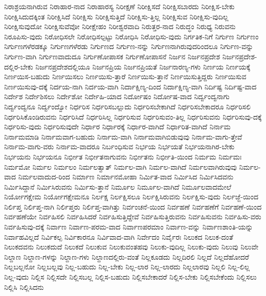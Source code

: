 {ನಿರಾಶ್ರಯನಾಗಿರುವ
ನಿರಾಹಾರ-ನಾದ
ನಿರಾಹಾರಸ್ಯ
ನಿರೀಕ್ಷಣೆ
ನಿರೀಕ್ಷಿಸದೆ
ನಿರೀಕ್ಷಿಸಬಾರದು
ನಿರೀಕ್ಷಿಸ-ಬೇಕು
ನಿರೀಕ್ಷಿಸಿದುದಕ್ಕಿಂತ
ನಿರೀಕ್ಷಿಸಿದೆ
ನಿರೀಕ್ಷಿಸು
ನಿರೀಕ್ಷಿಸುತ್ತಿದೆ
ನಿರೀಕ್ಷಿಸು-ತ್ತಿಲ್ಲ
ನಿರೀಕ್ಷಿಸುವ
ನಿರೀಕ್ಷಿಸು-ವುದಿಲ್ಲ
ನಿರೀಕ್ಷಿಸುವುದೋ
ನಿರೀಕ್ಷಿಸುವೆವೋ
ನಿರೀಕ್ಷೇಹಂ
ನಿರೀಶ್ವರವಾದಿ
ನಿರುತ್ತರ-ನಾದ
ನಿರುದ್ಧಂ
ನಿರುಧ್ಯ
ನಿರುವನು
ನಿರೂಪಿಸು-ವುದು
ನಿರೋಧಿಸಲೇ
ನಿರೋಧಿಸಲ್ಪಟ್ಟು
ನಿರೋಧಿಸಿ
ನಿರೋಧಿಸು-ವುದು
ನಿರ್ಗತಿಕ-ನಿಗೆ
ನಿರ್ಗುಣ
ನಿರ್ಗುಣಂ
ನಿರ್ಗುಣಗಳೆರಡಕ್ಕೂ
ನಿರ್ಗುಣಗಳೆರಡು
ನಿರ್ಗುಣದ
ನಿರ್ಗುಣ-ನನ್ನು
ನಿರ್ಗುಣನಾಗಿರುವುದರಿಂದಲೂ
ನಿರ್ಗುಣ-ವನ್ನು
ನಿರ್ಗುಣ-ವಾಗಿ
ನಿರ್ಗುಣವಾದುದೂ
ನಿರ್ಗುಣೋಪಾಸಕ
ನಿರ್ಗುಣೋಪಾಸನೆ
ನಿರ್ಜನ
ನಿರ್ಜನಪ್ರದೇಶ
ನಿರ್ಜನಪ್ರದೇಶ-ದಲ್ಲಿರ-ಬೇಕು
ನಿರ್ಜನಪ್ರದೇಶದಲ್ಲಿಯೂ
ನಿರ್ಜನಪ್ರಿಯ
ನಿರ್ಜನಪ್ರಿಯತೆ
ನಿರ್ಜನಾರಣ್ಯ-ಗಳು
ನಿರ್ಣಯ
ನಿರ್ಣಯಕ್ಕೆ
ನಿರ್ಣಯಿಸ-ಬಹುದು
ನಿರ್ಣಯಿಸಲು
ನಿರ್ಣಯಿಸು-ತ್ತಾರೆ
ನಿರ್ಣಯಿಸು-ತ್ತಾನೆ
ನಿರ್ಣಯಿಸುತ್ತಿದ್ದರು
ನಿರ್ಣಯಿಸುವ
ನಿರ್ಣಯಿಸುವು-ದಕ್ಕೆ
ನಿರ್ದಯ-ನಾಗಿ
ನಿರ್ದಯ-ವಾಗಿ
ನಿರ್ದಾಕ್ಷಿಣ್ಯ-ದಿಂದ
ನಿರ್ದಾಕ್ಷಿಣ್ಯ-ವಾಗಿ
ನಿರ್ದಿಷ್ಟ
ನಿರ್ದಿಷ್ಟ-ವಾದ
ನಿರ್ದೇಶ
ನಿರ್ದೇಶಿಸಲು
ನಿರ್ದೇಶೋ
ನಿರ್ದೇಹಿ-ಯಾದ
ನಿರ್ದೋಷಂ
ನಿರ್ದೋಷ-ವಾದ
ನಿರ್ದ್ವಂದ್ವನಾಗು
ನಿರ್ದ್ವಂದ್ವನೂ
ನಿರ್ದ್ವಂದ್ವೋ
ನಿರ್ಧರಿಸ
ನಿರ್ಧರಿಸಬಲ್ಲುದು
ನಿರ್ಧರಿಸಬೇಕಾಗಿದೆ
ನಿರ್ಧರಿಸಬೇಕಾದರೂ
ನಿರ್ಧರಿಸಲಿ
ನಿರ್ಧರಿಸಿಕೊಂಡಿರುವನು
ನಿರ್ಧರಿಸಿದೆ
ನಿರ್ಧರಿಸಿಲ್ಲ
ನಿರ್ಧರಿಸುವ
ನಿರ್ಧರಿಸುವಂ-ತಿಲ್ಲ
ನಿರ್ಧರಿಸುವನು
ನಿರ್ಧರಿಸುವು-ದಕ್ಕೆ
ನಿರ್ಧರಿಸು-ವುದು
ನಿರ್ಧರಿಸುವುದೇ
ನಿರ್ಧಾರ
ನಿರ್ಧಾರಕ್ಕೆ
ನಿರ್ಧಾರ-ವಾಗಿದೆ
ನಿರ್ಧಾರಿತ-ವಾಗಿದೆ
ನಿರ್ನಾಮ
ನಿರ್ನಾಮಮಾಡಿ
ನಿರ್ನಾಮವಾಗ-ಬಹುದು
ನಿರ್ನಾಮ-ವಾಗಿ
ನಿರ್ನಾಮವಾಗಿಬಿಡುವುವು
ನಿರ್ನಾಮ-ವಾಗು-ತ್ತೇವೆ
ನಿರ್ನಾಮ-ವಾಗು-ವರು
ನಿರ್ನಾಮ-ವಾದರೂ
ನಿರ್ಬಂಧಿಸುವ
ನಿರ್ಭಯ
ನಿರ್ಭಯತೆ
ನಿರ್ಭಯನಾಗಿರ-ಬೇಕು
ನಿರ್ಭಯನು
ನಿರ್ಭಯನೂ
ನಿರ್ಭೀತ
ನಿರ್ಭೀತನಾಗುವನು
ನಿರ್ಭೀತನು
ನಿರ್ಭೀತಿ-ಯಿಂದ
ನಿರ್ಮಮ
ನಿರ್ಮಮಃ
ನಿರ್ಮಮೋ
ನಿರ್ಮಲ
ನಿರ್ಮಲಂ
ನಿರ್ಮಲತ್ವಾತ್
ನಿರ್ಮಲ-ವಾಗಿ
ನಿರ್ಮಲ-ವಾಗಿದೆ
ನಿರ್ಮಲವಾಗಿರುವುವು
ನಿರ್ಮಲ-ವಾದ
ನಿರ್ಮಲವಾದುದ-ರಿಂದ
ನಿರ್ಮಾಣ
ನಿರ್ಮಾನಮೋಹಾ
ನಿರ್ಮಿತ-ವಾದ
ನಿರ್ಮಿಸಿದ
ನಿರ್ಮಿಸಿದವನು
ನಿರ್ಮಿಸಿದ್ದಾನೆ
ನಿರ್ಮಿಸಿರುವನು
ನಿರ್ಮಿಸು-ತ್ತಾನೆ
ನಿರ್ಮೂಲ
ನಿರ್ಮೂಲ-ವಾಗಿದೆ
ನಿರ್ಮೂಲವಾದಮೇಲೆ
ನಿರ್ಯೋಗಕ್ಷೇಮ
ನಿರ್ಯೋಗಕ್ಷೇಮನೂ
ನಿರ್ಲಕ್ಷ
ನಿರ್ಲಕ್ಷಿಸಲೂ
ನಿರ್ಲಕ್ಷಿಸಿರುವನು
ನಿರ್ಲಕ್ಷಿಸು-ವುದು
ನಿರ್ಲಜ್ಜೆ-ಯಿಂದ
ನಿರ್ಲಿಪ್ತ
ನಿರ್ಲಿಪ್ತ-ನಾಗಿ
ನಿರ್ಲಿಪ್ತರು
ನಿರ್ಲಿಪ್ತ-ವಾಗಿತ್ತು
ನಿರ್ವಂಚನೆ-ಯಿಂದ
ನಿರ್ವಹಣೆ
ನಿರ್ವಹಣೆಗೆ
ನಿರ್ವಹಣೆ-ಯಿಂದ
ನಿರ್ವಹಣೆಯೇ
ನಿರ್ವಹಿಸಲಿ
ನಿರ್ವಹಿಸಿದರೆ
ನಿರ್ವಹಿಸುತ್ತಿದ್ದೇವೆ
ನಿರ್ವಹಿಸುತ್ತಿರುವನು
ನಿರ್ವಹಿಸುವನು
ನಿರ್ವಹಿಸು-ವರು
ನಿರ್ವಹಿಸುವು-ದಕ್ಕೆ
ನಿರ್ವಾಣ
ನಿರ್ವಾಣ-ಪರಮ-ವಾದ
ನಿರ್ವಾಣಪರಮಾಂ
ನಿರ್ವಾಣ-ವನ್ನು
ನಿರ್ವಾಣಶಾಂತಿ-ಯನ್ನು
ನಿರ್ವಾಹವಿಲ್ಲದೆ
ನಿರ್ವಿಕಲ್ಪ
ನಿರ್ವಿಕಾರನೂ
ನಿರ್ವಿವಾದ-ವಾಗಿ
ನಿರ್ವೇದಂ
ನಿರ್ವೈರಃ
ನಿಲುಕದ
ನಿಲುಕ-ದಂತೆ
ನಿಲುಕದವನು
ನಿಲುಕದುದೆ
ನಿಲುಕದೆ
ನಿಲುಕುವ
ನಿಲುಕುವಂತಹವು
ನಿಲುಕು-ವುದಿಲ್ಲ
ನಿಲುಕು-ವುದು
ನಿಲುವು
ನಿಲುವೇ
ನಿಲ್ದಾಣ
ನಿಲ್ದಾಣ-ಗಳನ್ನು
ನಿಲ್ದಾಣ-ಗಳು
ನಿಲ್ದಾಣದಲ್ಲಿರು-ವಂತೆ
ನಿಲ್ಲಕೂಡದು
ನಿಲ್ಲದಿರಲಿ
ನಿಲ್ಲದೆ
ನಿಲ್ಲದೆಹೋದರೆ
ನಿಲ್ಲಬಲ್ಲನೋ
ನಿಲ್ಲಬಲ್ಲವು
ನಿಲ್ಲ-ಬಹುದು
ನಿಲ್ಲ-ಬೇಕು
ನಿಲ್ಲ-ಲಾರ
ನಿಲ್ಲ-ಲಾರದು
ನಿಲ್ಲಲಾರವು
ನಿಲ್ಲಲಿ
ನಿಲ್ಲ-ಲಿಲ್ಲ
ನಿಲ್ಲ-ವುದು
ನಿಲ್ಲಿಸ
ನಿಲ್ಲಿಸದೇ
ನಿಲ್ಲಿಸಬಲ್ಲ
ನಿಲ್ಲಿಸ-ಬಹುದು
ನಿಲ್ಲಿಸಬೇಕಾದರೆ
ನಿಲ್ಲಿಸ-ಬೇಕು
ನಿಲ್ಲಿಸಬೇಕೆಂದು
ನಿಲ್ಲಿಸಲು
ನಿಲ್ಲಿಸಿ
ನಿಲ್ಲಿಸಿದನು
}
